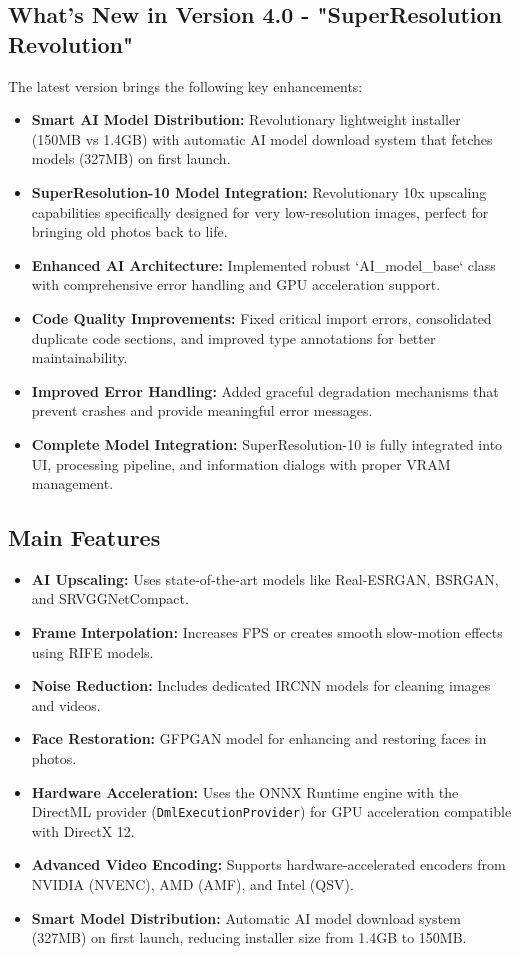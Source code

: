 \documentclass[11pt, a4paper]{article}
\begin{document}
\subsection{What's New in Version 4.0 - "SuperResolution Revolution"}
The latest version brings the following key enhancements:
\begin{itemize}[leftmargin=*]
    \item \textbf{Smart AI Model Distribution:} Revolutionary lightweight installer (150MB vs 1.4GB) with automatic AI model download system that fetches models (327MB) on first launch.
    \item \textbf{SuperResolution-10 Model Integration:} Revolutionary 10x upscaling capabilities specifically designed for very low-resolution images, perfect for bringing old photos back to life.
    \item \textbf{Enhanced AI Architecture:} Implemented robust `AI\_model\_base` class with comprehensive error handling and GPU acceleration support.
    \item \textbf{Code Quality Improvements:} Fixed critical import errors, consolidated duplicate code sections, and improved type annotations for better maintainability.
    \item \textbf{Improved Error Handling:} Added graceful degradation mechanisms that prevent crashes and provide meaningful error messages.
    \item \textbf{Complete Model Integration:} SuperResolution-10 is fully integrated into UI, processing pipeline, and information dialogs with proper VRAM management.
\end{itemize}

\subsection{Main Features}
\begin{itemize}[leftmargin=*]
    \item \textbf{AI Upscaling:} Uses state-of-the-art models like Real-ESRGAN, BSRGAN, and SRVGGNetCompact.
    \item \textbf{Frame Interpolation:} Increases FPS or creates smooth slow-motion effects using RIFE models.
    \item \textbf{Noise Reduction:} Includes dedicated IRCNN models for cleaning images and videos.
    \item \textbf{Face Restoration:} GFPGAN model for enhancing and restoring faces in photos.
    \item \textbf{Hardware Acceleration:} Uses the ONNX Runtime engine with the DirectML provider (\texttt{DmlExecutionProvider}) for GPU acceleration compatible with DirectX 12.
    \item \textbf{Advanced Video Encoding:} Supports hardware-accelerated encoders from NVIDIA (NVENC), AMD (AMF), and Intel (QSV).
    \item \textbf{Smart Model Distribution:} Automatic AI model download system (327MB) on first launch, reducing installer size from 1.4GB to 150MB.
\end{itemize}
\end{document}
